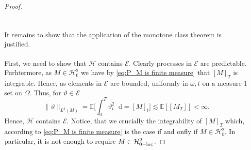 \documentclass[11pt,a4paper,twoside,openany]{report}
\newcommand{\diff}{\mathop{}\!\mathrm{d}}
\theoremstyle{plain} %
\theoremstyle{definition} %
\theoremstyle{remark} %
\begin{document}
\begin{proof}
\begin{equation}
    \end{equation}
    \\\\
 It remains to show that the application of the monotone class theorem is justified. 
    \\\\
    First, we need to show that \(\mathcal{H}\) contains \(\mathcal{E}\). Clearly processes in \(\mathcal{E}\) are predictable. Furhtermore, as \(M\in\mathcal{H}^2_0\) we have by \cref{eq:P_M is finite measure} that \([M]_T\) is integrable. Hence, as elements in \(\mathcal{E}\) are bounded, uniformly in \(\omega, t\) on a measure-1 set on \(\Omega\). Thus, for \(\vartheta\in\mathcal{E}\)
    \begin{equation}
        \lVert\vartheta\rVert_{L^2(M)}=\mathbb{E}\bigg[\int_0^T\vartheta_t^2\diff =[M]_t\bigg]\lesssim\mathbb{E}[[M_T]]<\infty.
    \end{equation}
    Hence, \(\mathcal{H}\) contains \(\mathcal{E}\). Notice, that we crucially the integrability of \([M]_T\) which, according to \cref{eq:P_M is finite measure} is the case if and onfly if \(M\in\mathcal{H}^2_0\). In particular, it is not enough to require \(M\in\mathcal{H}_{0-\rm{loc}}^2\).  
    

\end{proof}
\end{document}
